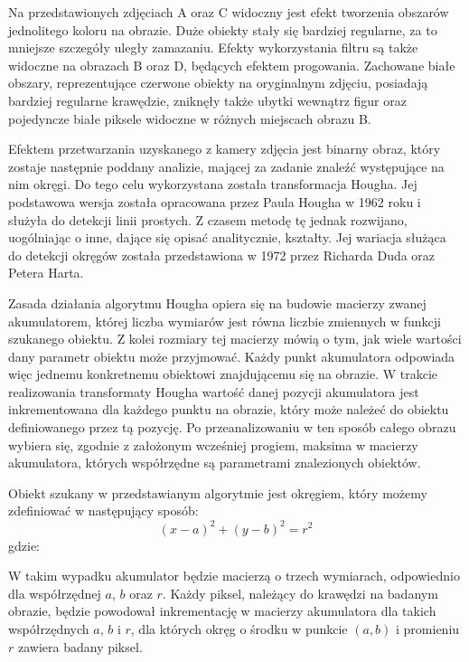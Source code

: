 Na przedstawionych zdjęciach A oraz C widoczny jest efekt tworzenia obszarów jednolitego koloru na obrazie. Duże obiekty stały się bardziej regularne, za to mniejsze szczegóły uległy zamazaniu. Efekty wykorzystania filtru są także widoczne na obrazach B oraz D, będących efektem progowania. Zachowane białe obszary, reprezentujące czerwone obiekty na oryginalnym zdjęciu, posiadają bardziej regularne krawędzie, zniknęły także ubytki wewnątrz figur oraz pojedyncze białe piksele widoczne w różnych miejscach obrazu B.

Efektem przetwarzania uzyskanego z kamery zdjęcia jest binarny obraz, który zostaje następnie poddany analizie, mającej za zadanie znaleźć występujące na nim okręgi. Do tego celu wykorzystana została transformacja Hougha. Jej podstawowa wersja została opracowana przez Paula Hougha w 1962 roku i służyła do detekcji linii prostych. Z czasem metodę tę jednak rozwijano, uogólniając o inne, dające się opisać analitycznie, kształty. Jej wariacja służąca do detekcji okręgów została przedstawiona w 1972 przez Richarda Duda oraz Petera Harta.

Zasada działania algorytmu Hougha opiera się na budowie macierzy zwanej akumulatorem, której liczba wymiarów jest równa liczbie zmiennych w funkcji szukanego obiektu. Z kolei rozmiary tej macierzy mówią o tym, jak wiele wartości dany parametr obiektu może przyjmować. Każdy punkt akumulatora odpowiada więc jednemu konkretnemu obiektowi znajdującemu się na obrazie. W trakcie realizowania transformaty Hougha wartość danej pozycji akumulatora jest inkrementowana dla każdego punktu na obrazie, który może należeć do obiektu definiowanego przez tą pozycję. Po przeanalizowaniu w ten sposób całego obrazu wybiera się, zgodnie z założonym wcześniej progiem, maksima w macierzy akumulatora, których współrzędne są parametrami znalezionych obiektów\cite{Sonka}.

Obiekt szukany w przedstawianym algorytmie jest okręgiem, który możemy zdefiniować w następujący sposób:
\begin{equation}
(x - a)^2 + (y - b)^2 = r^2
\label{eq:kolo}
\end{equation}
gdzie:
\begin{equationDescriptor}
\end{equationDescriptor}
W takim wypadku akumulator będzie macierzą o trzech wymiarach, odpowiednio dla współrzędnej $a$, $b$ oraz $r$. Każdy piksel, należący do krawędzi na badanym obrazie, będzie powodował inkrementację w macierzy akumulatora dla takich współrzędnych $a$, $b$ i $r$, dla których okręg o środku w punkcie $(a, b)$ i promieniu $r$ zawiera badany piksel.

